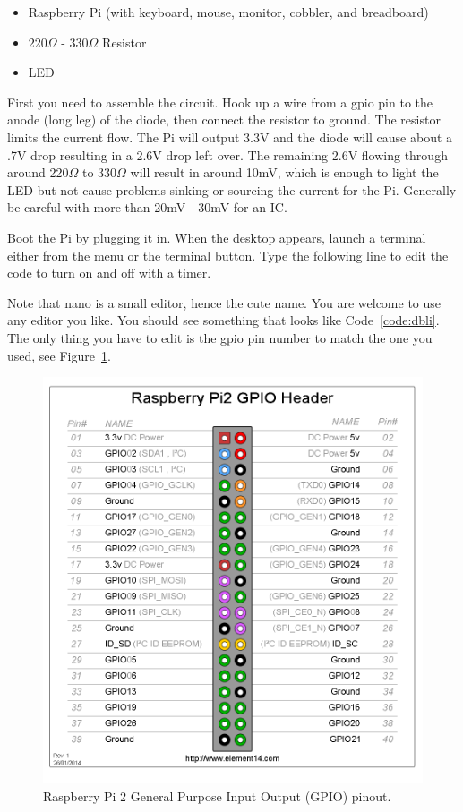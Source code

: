 \begin{itemize}
  \item Raspberry Pi (with keyboard, mouse, monitor, cobbler, and breadboard)
  \item 220$\Omega$ - 330$\Omega$ Resistor
  \item LED
\end{itemize}

First you need to assemble the circuit.  Hook up a wire from a gpio pin to the anode (long leg) of the diode, then connect the resistor to ground.  The resistor limits the current flow.  The Pi will output 3.3V and the diode will cause about a .7V drop resulting in a 2.6V drop left over.  The remaining 2.6V flowing through around 220$\Omega$ to 330$\Omega$ will result in around 10mV, which is enough to light the LED but not cause problems sinking or sourcing the current for the Pi.  Generally be careful with more than 20mV - 30mV for an IC.

Boot the Pi by plugging it in.  When the desktop appears, launch a terminal either from the menu or the terminal button.  Type the following line to edit the code to turn on and off with a timer.


Note that nano is a small editor, hence the cute name.  You are welcome to use any editor you like.  You should see something that looks like Code~\ref{code:dbli}.  The only thing you have to edit is the gpio pin number to match the one you used, see Figure~\ref{fig:RPiGPIO}.

\begin{figure}\begin{center}
\caption{Raspberry Pi 2 General Purpose Input Output (GPIO) pinout.}\label{fig:RPiGPIO}
\includegraphics[width=.7\textwidth]{../images/GPIO_Pi2.png}
\end{center}\end{figure}

